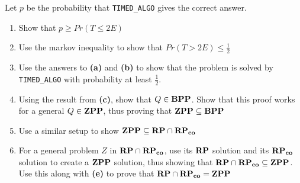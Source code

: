 \begin{enumerate}
Let $p$ be the probability that \texttt{TIMED\_ALGO} gives the correct answer.

\begin{enumerate}[label=\textbf{(\alph*)}]
\item Show that $p \ge Pr(T \le 2E)$
\item Use the markov inequality to show that $Pr(T > 2E) \le \frac12$
\item Use the answers to \textbf{(a)} and \textbf{(b)} to show that the problem is solved by \texttt{TIMED\_ALGO} 
with probability at least $\frac{1}{2}$. 
\item Using the result from \textbf{(c)}, show that $Q \in\mathbf{BPP}$. Show that this proof works 
for a general $Q \in \mathbf{ZPP}$, thus proving that $\mathbf{ZPP} \subseteq \mathbf{BPP}$
\item Use a similar setup to show $\mathbf{ZPP} \subseteq \mathbf{RP} \cap \mathbf{RP_{co}}$
\item For a general problem $Z$ in $\mathbf{RP} \cap \mathbf{RP_{co}}$, use its $\mathbf{RP}$ solution and its $\mathbf{RP_{co}}$ solution to create 
a $\mathbf{ZPP}$ solution, thus showing that $\mathbf{RP} \cap \mathbf{RP_{co}} \subseteq \mathbf{ZPP}$. Use this along with \textbf{(e)} to prove that 
$\mathbf{RP} \cap \mathbf{RP_{co}} = \mathbf{ZPP}$
\end{enumerate}

\end{enumerate}
